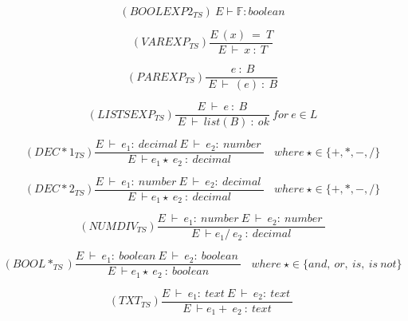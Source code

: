 \begin{equation}
    (BOOLEXP2_{TS}) \ E\vdash \mathbb{F} : boolean
\end{equation}

\begin{equation}
   (VAREXP_{TS}) \frac{E\ (x)\ =\ T}{\ E\ \vdash \ x\ :\ T}
\end{equation}

\begin{equation}
    (PAREXP_{TS}) \frac{\ e\ :\ B}{\ E\ \vdash \ (e)\ :\ B}
\end{equation}

\begin{equation}
   (LISTSEXP_{TS}) \frac{E\ \vdash\ e\ :\ B }
    {\ E\ \vdash \  list (B)\ :\ ok} 
    \ for \ e \in L
\end{equation}

\begin{equation}
    (DEC*1_{TS})\frac{E \ \vdash \ e_1 : \ decimal \ E \ \vdash \ e_2 : \ number \ }{E \ \vdash e_1 \star \ e_2 \ : \ decimal} \ \ \ \
    where \ \star \in \{ +, *, - , /\}
\end{equation}

\begin{equation}
    (DEC*2_{TS})\frac{E \ \vdash \ e_1 : \ number \ E \ \vdash \ e_2 : \ decimal \ }{E \ \vdash e_1 \star \ e_2 \ : \ decimal} \ \ \ \
    where \ \star \in \{ +, *, - , /\}
\end{equation}

\begin{equation}
    (NUMDIV_{TS})\frac{E \ \vdash \ e_1 : \ number \ E \ \vdash \ e_2 : \ number \ }{E \ \vdash e_1 / \ e_2 \ : \ decimal}
\end{equation}



\begin{equation}
    (BOOL*_{TS})\frac{E \ \vdash \ e_1 : \ boolean \ E \ \vdash \ e_2 : \ boolean \ }
    {E \ \vdash e_1 \star \ e_2 \ : \ boolean} \ \ \ \
    where \ \star \in \{ and, \ or, \ is, \ is \ not\}
\end{equation}

\begin{equation}
    (TXT_{TS})\frac{E \ \vdash \ e_1 : \ text \ E \ \vdash \ e_2 : \ text \ }{E \ \vdash e_1 + \ e_2 \ : \ text} \  
\end{equation}

